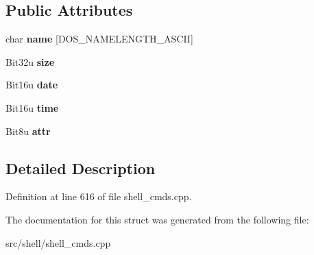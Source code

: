 \subsection*{Public Attributes}
\begin{DoxyCompactItemize}
\item 
\hypertarget{structDtaResult_a35acc0819ed5d484ae67b0a150702e65}{char {\bfseries name} \mbox{[}D\-O\-S\-\_\-\-N\-A\-M\-E\-L\-E\-N\-G\-T\-H\-\_\-\-A\-S\-C\-I\-I\mbox{]}}\label{structDtaResult_a35acc0819ed5d484ae67b0a150702e65}

\item 
\hypertarget{structDtaResult_ae204e54f6811d77f19876e6b7856ca58}{Bit32u {\bfseries size}}\label{structDtaResult_ae204e54f6811d77f19876e6b7856ca58}

\item 
\hypertarget{structDtaResult_ab6706554a1f9124eaf932dfff90dc962}{Bit16u {\bfseries date}}\label{structDtaResult_ab6706554a1f9124eaf932dfff90dc962}

\item 
\hypertarget{structDtaResult_a654e696728853f730e909750a2b35932}{Bit16u {\bfseries time}}\label{structDtaResult_a654e696728853f730e909750a2b35932}

\item 
\hypertarget{structDtaResult_a01eb3c4fe466f291e8ffd3d788ee9d6c}{Bit8u {\bfseries attr}}\label{structDtaResult_a01eb3c4fe466f291e8ffd3d788ee9d6c}

\end{DoxyCompactItemize}


\subsection{Detailed Description}


Definition at line 616 of file shell\-\_\-cmds.\-cpp.



The documentation for this struct was generated from the following file\-:\begin{DoxyCompactItemize}
\item 
src/shell/shell\-\_\-cmds.\-cpp\end{DoxyCompactItemize}
